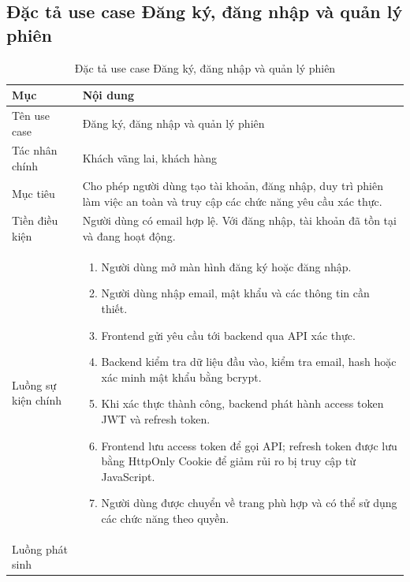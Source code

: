 \documentclass[../DoAn.tex]{subfiles}
\begin{document}
\subsection{Đặc tả use case Đăng ký, đăng nhập và quản lý phiên}
\label{subsection:2.3.1}

{\normalsize
\setlength{\LTleft}{\fill}
\setlength{\LTright}{\fill}
\setlength{\tabcolsep}{5pt}
\renewcommand{\arraystretch}{1.25}
\begin{longtable}{|p{3.2cm}|p{10.4cm}|}
\caption{Đặc tả use case Đăng ký, đăng nhập và quản lý phiên}
\label{table:2.4}\\
\hline
\textbf{Mục} & \textbf{Nội dung} \\ \hline
Tên use case & Đăng ký, đăng nhập và quản lý phiên \\ \hline
Tác nhân chính & Khách vãng lai, khách hàng \\ \hline
Mục tiêu & Cho phép người dùng tạo tài khoản, đăng nhập, duy trì phiên làm việc an toàn và truy cập các chức năng yêu cầu xác thực. \\ \hline
Tiền điều kiện & Người dùng có email hợp lệ. Với đăng nhập, tài khoản đã tồn tại và đang hoạt động. \\ \hline
Luồng sự kiện chính &
\begin{minipage}[t]{10.1cm}
\begin{enumerate}[leftmargin=*,topsep=0pt,itemsep=0pt]
    \item Người dùng mở màn hình đăng ký hoặc đăng nhập.
    \item Người dùng nhập email, mật khẩu và các thông tin cần thiết.
    \item Frontend gửi yêu cầu tới backend qua API xác thực.
    \item Backend kiểm tra dữ liệu đầu vào, kiểm tra email, hash hoặc xác minh mật khẩu bằng bcrypt.
    \item Khi xác thực thành công, backend phát hành access token JWT và refresh token.
    \item Frontend lưu access token để gọi API; refresh token được lưu bằng HttpOnly Cookie để giảm rủi ro bị truy cập từ JavaScript.
    \item Người dùng được chuyển về trang phù hợp và có thể sử dụng các chức năng theo quyền.
\end{enumerate}
\end{minipage} \\ \hline
Luồng phát sinh &
\begin{minipage}[t]{10.1cm}
\begin{itemize}[leftmargin=*,topsep=0pt,itemsep=0pt]

\end{itemize}
\end{minipage}
\end{longtable}}
\end{document}
